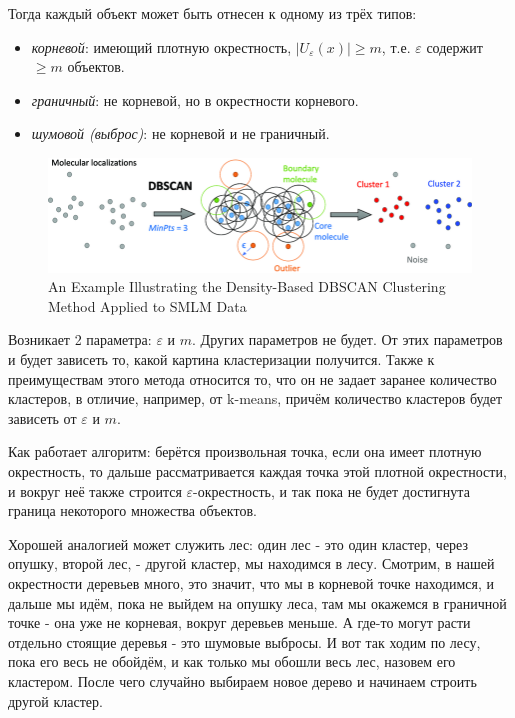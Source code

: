 \newcommand{\abs}[1]{\left|#1\right|}

Тогда каждый объект может быть отнесен к одному из трёх типов:
\begin{itemize}
    \item \textit{корневой}: имеющий плотную окрестность,  {$\abs{U_\varepsilon (x)} \geq m$}, т.е. $\varepsilon$ содержит $\geq m$ объектов.
    \item \textit{граничный}: не корневой, но в окрестности корневого.
    \item \textit{шумовой (выброс)}: не корневой и не граничный.
\end{itemize}
\begin{figure}[h!]
    \centering
    \includegraphics[width=0.9\linewidth]{chapters/clustering/png/An-Example-Illustrating-the-Density-Based-DBSCAN-Clustering-Method-Applied-to-SMLM-Data.png}
    \caption{An Example Illustrating the Density-Based DBSCAN Clustering Method Applied to SMLM Data}
    \label{fig:enter-label-2}
\end{figure}
Возникает 2 параметра: $\varepsilon$ и $m$. Других параметров не будет. От этих параметров и будет зависеть то, какой картина кластеризации получится. Также к преимуществам этого метода относится то, что он не задает заранее количество кластеров, в отличие, например, от k-means, причём количество кластеров будет зависеть от $\varepsilon$ и $m$. 

Как работает алгоритм: берётся произвольная точка, если она имеет плотную окрестность, то дальше рассматривается каждая точка этой плотной окрестности, и вокруг неё также строится $\varepsilon$-окрестность, и так пока не будет достигнута граница некоторого множества объектов. 

Хорошей аналогией может служить лес: один лес - это один кластер, через опушку, второй лес, - другой кластер, мы находимся в лесу. Смотрим, в нашей окрестности деревьев много, это значит, что мы в корневой точке находимся, и дальше мы идём, пока не выйдем на опушку леса, там мы окажемся в граничной точке - она уже не корневая, вокруг деревьев меньше. А где-то могут расти отдельно стоящие деревья - это шумовые выбросы. И вот так ходим по лесу, пока его весь не обойдём, и как только мы обошли весь лес, назовем его кластером. После чего случайно выбираем новое дерево и начинаем строить другой кластер.

